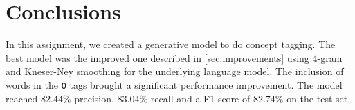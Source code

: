 \section{Conclusions}
\label{sec:conclusions}

In this assignment, we created a generative model to do concept tagging.
The best model was the improved one described in \cref{sec:improvements} using 4-gram and Kneser-Ney smoothing for the underlying language model.
The inclusion of words in the \texttt{O} tags brought a significant performance improvement.
The model reached $82.44\%$ precision, $83.04\%$ recall and a F1 score of $82.74\%$ on the test set.
